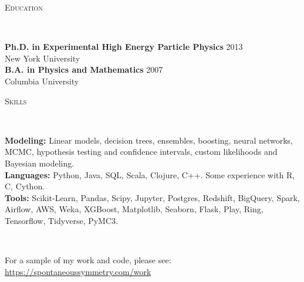 \documentclass[9pt]{article}
\newenvironment{changemargin}[2]{%
  \begin{list}{}{%
    \setlength{\topsep}{0pt}%
    \setlength{\leftmargin}{#1}%
    \setlength{\rightmargin}{#2}%
    \setlength{\listparindent}{\parindent}%
    \setlength{\itemindent}{\parindent}%
    \setlength{\parsep}{\parskip}%
  }%
  \item[]}{\end{list}
}
\newcommand{\lineover}{
  \begin{changemargin}{-0.05in}{-0.05in}
    \vspace*{-8pt}
    \hrulefill \\
    \vspace*{-2pt}
  \end{changemargin}
}
\newcommand{\header}[1]{
  \begin{changemargin}{-0.5in}{-0.5in}
    \scshape{#1}
    \lineover
  \end{changemargin}
}
\newenvironment{body} {
  \vspace*{-16pt}
\begin{changemargin}{-0.25in}{-0.5in}
  }
{\end{changemargin}
}
\begin{document}
\smallskip

\header{Education}

\begin{body}
  \vspace{14pt}
  \textbf{Ph.D. in Experimental High Energy Particle Physics }{} \hfill 2013{} \\
  New York University \\
  \medskip
  \textbf{B.A. in Physics and Mathematics} \hfill 2007 \\
  Columbia University\\
\end{body}

\header{Skills}
\begin{body}
  \vspace{14pt}
  \textbf{Modeling:}{} Linear models, decision trees, ensembles, boosting, neural networks, MCMC, hypothesis testing and confidence intervals, custom likelihoods and Bayesian modeling. \\
  \textbf{Languages:}{} Python, Java, SQL, Scala, Clojure, C++.  Some experience with R, C, Cython. \\
  \textbf{Tools:}{} Scikit-Learn, Pandas, Scipy, Jupyter, Postgres, Redshift, BigQuery, Spark, Airflow, AWS, Weka, XGBoost, Matplotlib, Seaborn, Flask, Play, Ring, Tensorflow, Tidyverse, PyMC3. \\
\end{body}

\smallskip


\header{}
\begin{body}
  \vspace{14pt}
  For a sample of my work and code, please see: {\url{https://spontaneoussymmetry.com/work}}
\end{body}
\end{document}
